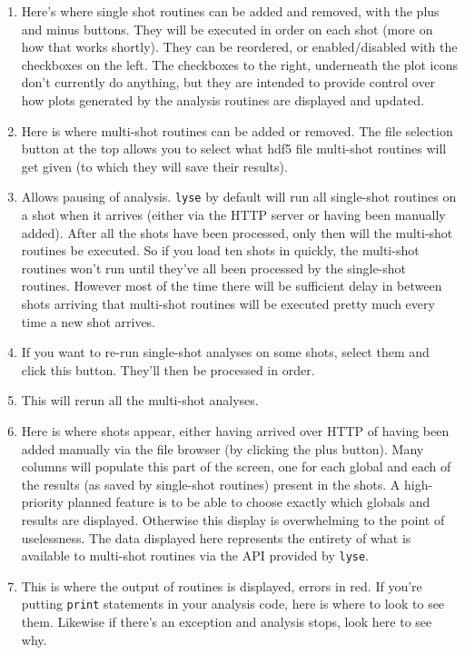 \documentclass[a4paper,11pt,titlepage]{article}
\begin{document}
\begin{enumerate}
\item Here's where single shot routines can be added and removed, with the plus and minus buttons. They will be executed in order on each shot (more on how that works shortly). They can be reordered, or enabled/disabled with the checkboxes on the left. The checkboxes to the right, underneath the plot icons don't currently do anything, but they are intended to provide control over how plots generated by the analysis routines are displayed and updated.

\item Here is where multi-shot routines can be added or removed. The file selection button at the top allows you to select what hdf5 file multi-shot routines will get given (to which they will save their results).

\item Allows pausing of analysis. \texttt{lyse} by default will run all single-shot routines on a shot when it arrives (either via the HTTP server or having been manually added). After all the shots have been processed, only then will the multi-shot routines be executed. So if you load ten shots in quickly, the multi-shot routines won't run until they've all been processed by the single-shot routines. However most of the time there will be sufficient delay in between shots arriving that multi-shot routines will be executed pretty much every time a new shot arrives.

\item If you want to re-run single-shot analyses on some shots, select them and click this button. They'll then be processed in order.

\item This will rerun all the multi-shot analyses.

\item Here is where shots appear, either having arrived over HTTP of having been added manually via the file browser (by clicking the plus button). Many columns will populate this part of the screen, one for each global and each of the results (as saved by single-shot routines) present in the shots. A high-priority planned feature is to be able to choose exactly which globals and results are displayed. Otherwise this display is overwhelming to the point of uselessness. The data displayed here represents the entirety of what is available to multi-shot routines via the API provided by \texttt{lyse}.

\item This is where the output of routines is displayed, errors in red. If you're putting \texttt{print} statements in your analysis code, here is where to look to see them. Likewise if there's an exception and analysis stops, look here to see why.
\end{enumerate}
\end{document}

